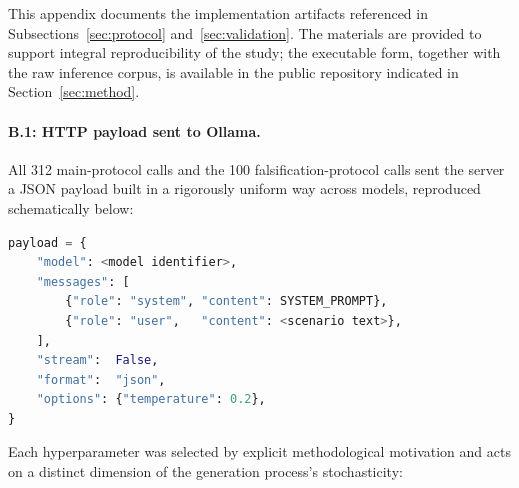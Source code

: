 \documentclass{sbc2023}%
\begin{document}
This appendix documents the implementation artifacts referenced in Subsections~\ref{sec:protocol} and~\ref{sec:validation}. The materials are provided to support integral reproducibility of the study; the executable form, together with the raw inference corpus, is available in the public repository indicated in Section~\ref{sec:method}.

\paragraph{B.1: HTTP payload sent to Ollama.} All 312 main-protocol calls and the 100 falsification-protocol calls sent the server a JSON payload built in a rigorously uniform way across models, reproduced schematically below:

\begin{lstlisting}[language=Python]
payload = {
    "model": <model identifier>,
    "messages": [
        {"role": "system", "content": SYSTEM_PROMPT},
        {"role": "user",   "content": <scenario text>},
    ],
    "stream":  False,
    "format":  "json",
    "options": {"temperature": 0.2},
}
\end{lstlisting}

Each hyperparameter was selected by explicit methodological motivation and acts on a distinct dimension of the generation process's stochasticity:
\end{document}
